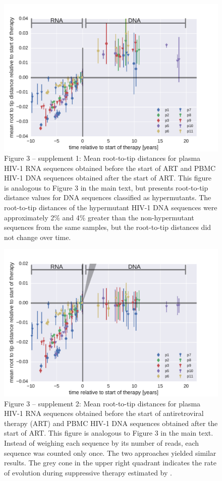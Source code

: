 \documentclass[aps,rmp,onecolumn,linenumbers]{revtex4-1}
\begin{document}
\begin{figure}
\centering
\includegraphics[width=0.7\columnwidth]{figures/fig3_S1}
\caption{Figure 3 -- supplement 1: Mean root-to-tip distances for plasma HIV-1 RNA sequences obtained before the start of ART and PBMC HIV-1 DNA sequences obtained after the start of ART. This figure is analogous to Figure 3 in the main text, but presents root-to-tip distance values for DNA sequences classified as hypermutants. The root-to-tip distances of the hypermutant HIV-1 DNA sequences were approximately 2\% and 4\% greater than the non-hypermutant sequences from the same samples, but the root-to-tip distances did not change over time.}
\label{fig:root_to_tip_hyper}
\end{figure}
\begin{figure}
\centering
\includegraphics[width=0.7\columnwidth]{figures/fig3_S2}
\caption{Figure 3 -- supplement 2: Mean root-to-tip distances for plasma HIV-1 RNA sequences obtained before the start of antiretroviral therapy (ART) and PBMC HIV-1 DNA sequences obtained after the start of ART. This figure is analogous to Figure 3 in the main text. Instead of weighing each sequence by its number of reads, each sequence was counted only once. The two approaches yielded similar results. The grey cone in the upper right quadrant indicates the rate of evolution during suppressive therapy estimated by \citet{lorenzo-redondo_persistent_2016}.}
\label{fig:root_to_tip_hap}
\end{figure}
\end{document}
